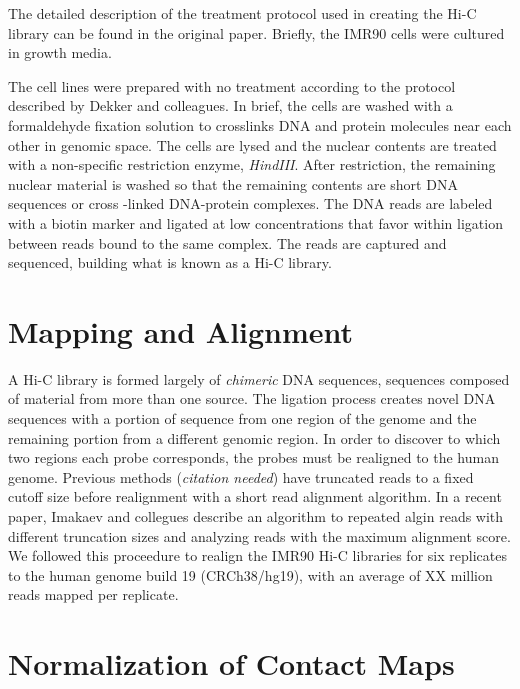 \documentclass[phd,tocprelim]{cornell}
\begin{document}
The detailed description of the treatment protocol used in creating the Hi-C
library can be found in the original paper\cite{ren2013}.  Briefly, the IMR90
cells were cultured in growth media.

The cell lines were prepared with no treatment according to the protocol
described by Dekker and colleagues\cite{dekker2013}.  In brief, the cells
are washed with a formaldehyde fixation solution to crosslinks DNA and
protein molecules near each other in genomic space.  The cells are
lysed and the nuclear contents are treated with a non-specific restriction
enzyme, \textit{HindIII}.  After restriction, the remaining nuclear material
is washed so that the remaining contents are short DNA sequences or cross
-linked DNA-protein complexes.  The DNA reads are labeled with a biotin
marker and ligated at low concentrations that favor within ligation between
reads bound to the same complex.  The reads are captured and sequenced,
building what is known as a Hi-C library.





\section{Mapping and Alignment}

A Hi-C library is formed largely of \textit{chimeric} DNA sequences,
sequences composed of material from more than one source.  The ligation process
creates novel DNA sequences with a portion of sequence from one region of
the genome and the remaining portion from a different genomic region.  In
order to discover to which two regions each probe corresponds, the probes
must be realigned to the human genome.  Previous methods (\textit{citation needed})
have truncated reads to a fixed cutoff size before realignment with a short
read alignment algorithm.  In a recent paper, Imakaev and collegues
describe an algorithm to repeated algin reads with different truncation sizes
and analyzing reads with the maximum alignment score\cite{imakaev2012}.  We followed
this proceedure to realign the IMR90 Hi-C libraries for six replicates to
the human genome build 19 (CRCh38/hg19), with an average of XX million reads
mapped per replicate.

\section{Normalization of Contact Maps}
\end{document}
